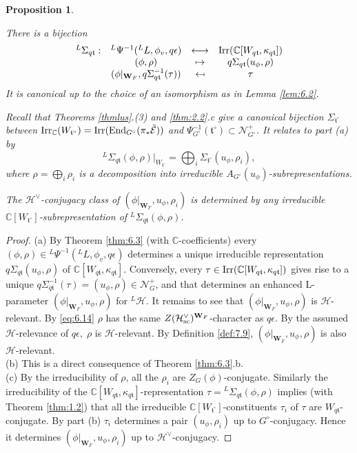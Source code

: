 \documentclass[11pt]{amsart}
\newtheorem{prop}[thm]{Proposition}
\theoremstyle{definition}
\newcommand{\enuma}[1]{\begin{enumerate}[\textup{(}a\textup{)}] {#1} \end{enumerate}}
\newcommand{\mb}{\mathbf}
\newcommand{\C}{\mathbb C}
\def\End{{\rm End}}
\def\Irr{{\rm Irr}}
\def\cN{{\mathcal N}}
\def\cH{{\mathcal H}}
\def\cE{{\mathcal E}}
\def\ft{{\mathfrak t}}
\def\sc{{\rm sc}}
\begin{document}
\begin{prop}\label{prop:10.1}  
\enuma{
\item There is a bijection
\[
\begin{array}{cccc}
{}^L \Sigma_{q \ft} : & {}^L \Psi^{-1} ({}^L L, \phi_v, q \epsilon) & 
\longleftrightarrow & \Irr (\C [W_{q \ft}, \kappa_{q \ft}]) \\
 & (\phi,\rho) & \mapsto & q \Sigma_{q \ft}(u_\phi,\rho) \\
 & (\phi |_{\mb W_F},q \Sigma_{q \ft}^{-1}(\tau) ) & \reflectbox{$\mapsto$} & \tau 
\end{array}
\]
It is canonical up to the choice of an isomorphism as in Lemma \ref{lem:6.2}.
\item Recall that Theorems \ref{thmlus}.(3) and \ref{thm:2.2}.c give a canonical 
bijection $\Sigma_{\ft^\circ}$ between $\Irr_\C (W_{\ft^\circ}) = 
\Irr (\End_{G^\circ} (\pi_* \tilde{\cE}))$ and $\Psi_{G^\circ}^{-1}(\ft^\circ) 
\subset \cN_{G^\circ}^+$. It relates to part (a) by
\[
{}^L \Sigma_{q \ft} (\phi,\rho) |_{W_{\ft^\circ}} = 
\bigoplus\nolimits_i \Sigma_{\ft^\circ} (u_\phi,\rho_i) ,
\]
where $\rho = \bigoplus_i \rho_i$ is a decomposition into irreducible
$A_{G^\circ}(u_\phi)$-subrepresentations.
\item The $\cH^\vee$-conjugacy class of $(\phi|_{\mb W_F},u_\phi,\rho_i)$
is determined by any irreducible $\C [W_{\ft^\circ}]$-subrepresentation of
${}^L \Sigma_{q \ft}(\phi,\rho)$.
} 
\end{prop}
\begin{proof}
(a) By Theorem \ref{thm:6.3} (with $\C$-coefficients) every $(\phi,\rho) \in
{}^L \Psi^{-1} ({}^L L, \phi_v, q \epsilon)$ determines a unique irreducible
representation $q \Sigma_{q \ft}(u_\phi,\rho)$ of $\C [W_{q \ft}, \kappa_{q \ft}]$.
Conversely, every $\tau \in \Irr (\C [W_{q \ft}, \kappa_{q \ft}])$ gives rise to
a unique $q \Sigma_{q \ft}^{-1}(\tau) = (u_\phi,\rho) \in \cN_G^+$, and that
determines an enhanced L-parameter $(\phi|_{\mb W_F},u_\phi,\rho)$ for ${}^L \cH$.
It remains to see that $(\phi|_{\mb W_F},u_\phi,\rho)$ is $\cH$-relevant.
By \eqref{eq:6.14} $\rho$ has the same $Z(\cH^\vee_{\sc})^{\mb W_F}$-character
as $q \epsilon$. By the assumed $\cH$-relevance of $q \epsilon ,\; \rho$ is
$\cH$-relevant. By Definition \ref{def:7.9}, $(\phi|_{\mb W_F},u_\phi,\rho)$
is also $\cH$-relevant.\\
(b) This is a direct consequence of Theorem \ref{thm:6.3}.b.\\
(c) By the irreducibility of $\rho$, all the $\rho_i$ are $Z_G (\phi)$-conjugate.
Similarly the irreducibility of the $\C [W_{q \ft}, \kappa_{q \ft}]$-representation
$\tau = {}^L \Sigma_{q \ft}(\phi,\rho)$ implies (with Theorem \ref{thm:1.2}) that
all the irreducible $\C [W_{\ft^\circ}]$-constituents $\tau_i$ of $\tau$ are
$W_{q \ft}$-conjugate. By part (b) $\tau_i$ determines a pair $(u_\phi,\rho_i)$
up to $G^\circ$-conjugacy. Hence it determines $(\phi|_{\mb W_F},u_\phi,\rho_i)$
up to $\cH^\vee$-conjugacy.
\end{proof}
\end{document}
